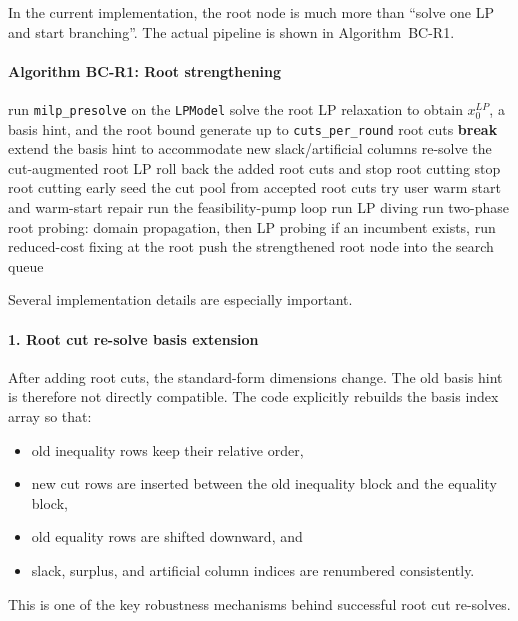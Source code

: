 In the current implementation, the root node is much more than ``solve one LP and start branching''. The actual pipeline is shown in Algorithm~BC-R1.

\paragraph{Algorithm BC-R1: Root strengthening}
\begin{algorithmic}[1]
  \State run \texttt{milp\_presolve} on the \texttt{LPModel}
  \State solve the root LP relaxation to obtain \(x_0^{LP}\), a basis hint, and the root bound
      \State generate up to \texttt{cuts\_per\_round} root cuts
       \State \textbf{break} \EndIf
      \State extend the basis hint to accommodate new slack/artificial columns
      \State re-solve the cut-augmented root LP
       \State roll back the added root cuts and stop root cutting \EndIf
       \State stop root cutting early \EndIf
    \EndFor
  \EndIf
  \State seed the cut pool from accepted root cuts
  \State try user warm start and warm-start repair
  \State run the feasibility-pump loop
  \State run LP diving
  \State run two-phase root probing: domain propagation, then LP probing
  \State if an incumbent exists, run reduced-cost fixing at the root
  \State push the strengthened root node into the search queue
\EndProcedure
\end{algorithmic}

Several implementation details are especially important.

\paragraph{1. Root cut re-solve basis extension}
After adding root cuts, the standard-form dimensions change. The old basis hint is therefore not directly compatible. The code explicitly rebuilds the basis index array so that:
\begin{itemize}
  \item old inequality rows keep their relative order,
  \item new cut rows are inserted between the old inequality block and the equality block,
  \item old equality rows are shifted downward, and
  \item slack, surplus, and artificial column indices are renumbered consistently.
\end{itemize}
This is one of the key robustness mechanisms behind successful root cut re-solves.

